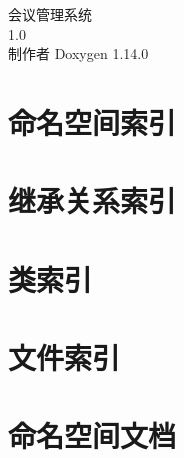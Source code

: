 \documentclass[twoside]{book}
\newcommand{\+}{\discretionary{\mbox{\scriptsize$\hookleftarrow$}}{}{}}
\newcommand{\clearemptydoublepage}{%
    \newpage{\pagestyle{empty}\cleardoublepage}%
  }
\begin{document}
  \raggedbottom
  \begin{CJK}{UTF8}{gbsn}
    \hypersetup{pageanchor=false,
                bookmarksnumbered=true,
                pdfencoding=unicode
               }
  \begin{titlepage}
  \vspace*{7cm}
  \begin{center}%
  {\Large 会议管理系统}\\
  [1ex]\large 1.\+0 \\
  \vspace*{1cm}
  {\large 制作者 Doxygen 1.14.0}\\
  \end{center}
  \end{titlepage}
  \clearemptydoublepage
  \tableofcontents
  \clearemptydoublepage
  \hypersetup{pageanchor=true}

\chapter{命名空间索引}

\chapter{继承关系索引}

\chapter{类索引}

\chapter{文件索引}

\chapter{命名空间文档}


















\end{CJK}
\end{document}
